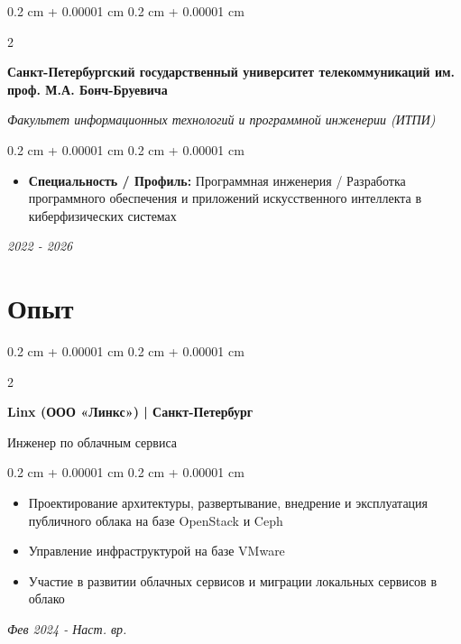 \documentclass[10pt, letterpaper]{article}
\newenvironment{highlights}{
    \begin{itemize}[
        topsep=0.20 cm,
        parsep=0.20 cm,
        partopsep=0pt,
        itemsep=0pt,
        leftmargin=0.4 cm + 10pt
    ]
}{
    \end{itemize}
} %
\newenvironment{onecolentry}{
    \begin{adjustwidth}{
        0.2 cm + 0.00001 cm
    }{
        0.2 cm + 0.00001 cm
    }
}{
    \end{adjustwidth}
} %
\newenvironment{twocolentry}[2][]{
    \onecolentry
    \def\secondColumn{#2}
    \setcolumnwidth{\fill, 4.5 cm}
    \begin{paracol}{2}
}{
    \switchcolumn \raggedleft \secondColumn
    \end{paracol}
    \endonecolentry
} %
\begin{document}
        \begin{twocolentry}{

        \textit{2022 - 2026}}
            \textbf{Санкт-Петербургский государственный университет телекоммуникаций им. проф. М.А. Бонч-Бруевича}

            \textit{Факультет информационных технологий и программной инженерии (ИТПИ)}

        \vspace{0.10 cm}
        \begin{onecolentry}
            \begin{highlights}

                \item \textbf{Специальность / Профиль:} Программная инженерия / Разработка программного обеспечения и приложений искусственного интеллекта в киберфизических системах
            \end{highlights}
        \end{onecolentry}
        
        \end{twocolentry}

    \vspace{0.3 cm - 0.3 cm}

    \section{Опыт}
    \begin{twocolentry}{
        \textit{Фев 2024 - Наст. вр.}}
        
            \textbf{Linx (ООО «Линкс») | Санкт-Петербург}
                \item Инженер по облачным сервиса
        
        \textit{}

        \begin{onecolentry}
            \begin{highlights}
                \item Проектирование архитектуры, развертывание, внедрение и эксплуатация публичного облака на базе OpenStack и Ceph 
                \item Управление инфраструктурой на базе VMware
                \item Участие в развитии облачных сервисов и миграции локальных сервисов в облако

            \end{highlights}
        \end{onecolentry}
        \end{twocolentry}
\end{document}
